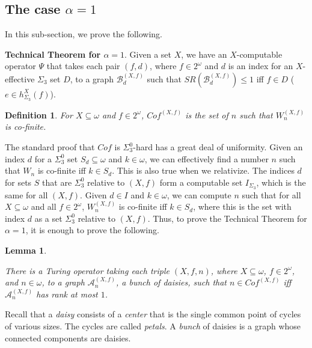 \documentclass{article}
\newtheorem{lem}[thm]{Lemma}
\newtheorem{defn}{Definition}
\begin{document}
\subsection{The case $\alpha=1$}

In this sub-section, we prove the following.        

\bigskip
\noindent
\textbf{Technical Theorem for $\alpha = 1$}.  Given a set $X$, we have an $X$-computable operator $\Psi$ that takes each pair $(f,d)$, where $f\in 2^\omega$ and $d$ is an index for an $X$-effective $\Sigma_3$ set $D$, to a graph $\mathcal{B}^{(X,f)}_d$ such that $SR(\mathcal{B}^{(X,f)}_d) \leq 1$ iff  $f\in D$ ($e\in h^X_{\Sigma_3}(f)$).        
 
\begin{defn}

For $X\subseteq\omega$ and $f\in 2^\omega$, $Cof^{(X,f)}$ is the set of $n$ such that $W_n^{(X,f)}$ is co-finite.  

\end{defn}

The standard proof that $Cof$ is $\Sigma^0_3$-hard has a great deal of uniformity.  Given an index $d$ for a $\Sigma^0_3$ set $S_d\subseteq\omega$ and $k\in\omega$, we can effectively find a number $n$ such that $W_n$ is co-finite iff $k\in S_d$.  This is also true when we relativize.  The indices $d$ for sets $S$ that are $\Sigma^0_3$ relative to $(X,f)$ form a computable set $I_{\Sigma_3}$, which is the same for all $(X,f)$.  Given $d\in I$ and $k\in\omega$, we can compute $n$ such that for all $X\subseteq\omega$ and all $f\in 2^\omega$, $W_n^{(X,f)}$ is co-finite iff $k\in S_d$, where this is the set with index $d$ as a set $\Sigma^0_3$ relative to $(X,f)$.  Thus, to prove the Technical Theorem for $\alpha = 1$, it is enough to prove the following.

\begin{lem}
\label{Cof}  

There is a Turing operator taking each triple $(X,f,n)$, where $X\subseteq\omega$, $f\in 2^\omega$, and $n\in\omega$, to a graph $\mathcal{A}^{(X,f)}_n$, a bunch of daisies, such that $n\in Cof^{(X,f)}$ iff $\mathcal{A}^{(X,f)}_n$ has rank at most $1$.    

\end{lem}

Recall that a \emph{daisy} consists of a \emph{center} that is the single common point of cycles of various sizes.  The cycles are called \emph{petals}.  A \emph{bunch} of daisies is a graph whose connected components are daisies.  
\end{document}
